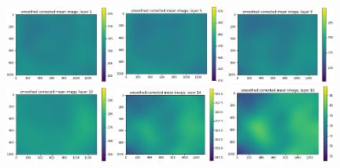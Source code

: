 \documentclass[letterpaper,11pt]{article}
\begin{document}
\begin{figure}[!ht]
\centering
\includegraphics[width=0.32\textwidth]{images/results/smoothed_corrected_mean_image_layers/smoothed_corrected_mean_image_layer_1_same_scale}
\includegraphics[width=0.32\textwidth]{images/results/smoothed_corrected_mean_image_layers/smoothed_corrected_mean_image_layer_5_same_scale}
\includegraphics[width=0.32\textwidth]{images/results/smoothed_corrected_mean_image_layers/smoothed_corrected_mean_image_layer_9_same_scale}
\includegraphics[width=0.32\textwidth]{images/results/smoothed_corrected_mean_image_layers/smoothed_corrected_mean_image_layer_10_same_scale}
\includegraphics[width=0.32\textwidth]{images/results/smoothed_corrected_mean_image_layers/smoothed_corrected_mean_image_layer_14_same_scale}
\includegraphics[width=0.32\textwidth]{images/results/smoothed_corrected_mean_image_layers/smoothed_corrected_mean_image_layer_18_same_scale}

\end{figure}
\end{document}

